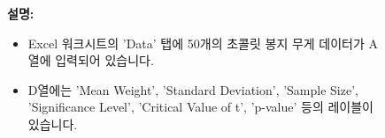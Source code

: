 \documentclass[11pt,a4paper]{article}
\theoremstyle{definition}
\begin{document}
\begin{figure}[h!]
    \centering
    \label{fig:excel_data_sheet}
    \vspace{0.5em}
    \textbf{설명:}
    \begin{itemize}
        \item Excel 워크시트의 'Data' 탭에 50개의 초콜릿 봉지 무게 데이터가 A열에 입력되어 있습니다.
        \item D열에는 'Mean Weight', 'Standard Deviation', 'Sample Size', 'Significance Level', 'Critical Value of t', 'p-value' 등의 레이블이 있습니다.
    \end{itemize}
\end{figure}
\end{document}
